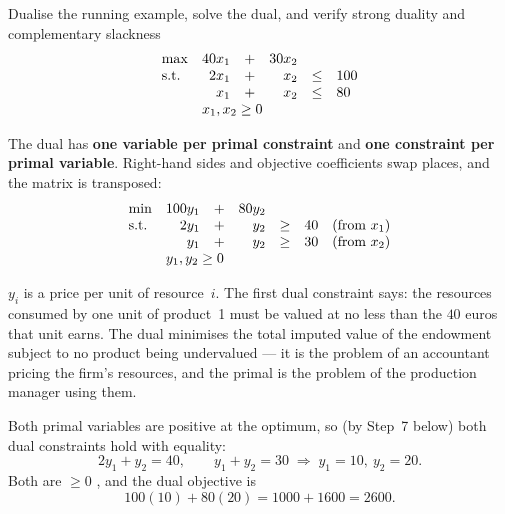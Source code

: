 \begin{worked}{Dualise the running example, solve the dual, and verify strong duality and complementary slackness}
\[
  \begin{array}{lrcrcl}
    \max & 40x_{1} & + & 30x_{2}\\
    \text{s.t.} & 2x_{1} & + & x_{2} & \le & 100\\
                & x_{1} & + & x_{2} & \le & 80\\
                & \multicolumn{5}{l}{x_{1},x_{2}\ge0}
  \end{array}
\]

The dual has \textbf{one variable per primal constraint} and \textbf{one
constraint per primal variable}. Right-hand sides and objective
coefficients swap places, and the matrix is transposed:
\[
  \begin{array}{lrcrcl}
    \min & 100y_{1} & + & 80y_{2}\\
    \text{s.t.} & 2y_{1} & + & y_{2} & \ge & 40 \quad(\text{from }x_{1})\\
                & y_{1} & + & y_{2} & \ge & 30 \quad(\text{from }x_{2})\\
                & \multicolumn{5}{l}{y_{1},y_{2}\ge0}
  \end{array}
\]

$y_{i}$ is a price per unit of resource~$i$. The first dual constraint says:
the resources consumed by one unit of product~1 must be valued at no less
than the $40$ euros that unit earns. The dual minimises the total imputed
value of the endowment subject to no product being undervalued --- it is the
problem of an accountant pricing the firm's resources, and the primal is the
problem of the production manager using them.

Both primal variables are positive at the optimum, so (by Step~7 below) both
dual constraints hold with equality:
\[
  2y_{1}+y_{2}=40,\qquad y_{1}+y_{2}=30
  \;\Longrightarrow\;
  y_{1}=10,\ y_{2}=20 .
\]
Both are $\ge0$ \checkmark, and the dual objective is
\[
  100(10)+80(20)=1000+1600=2600 .
\]


\end{worked}
